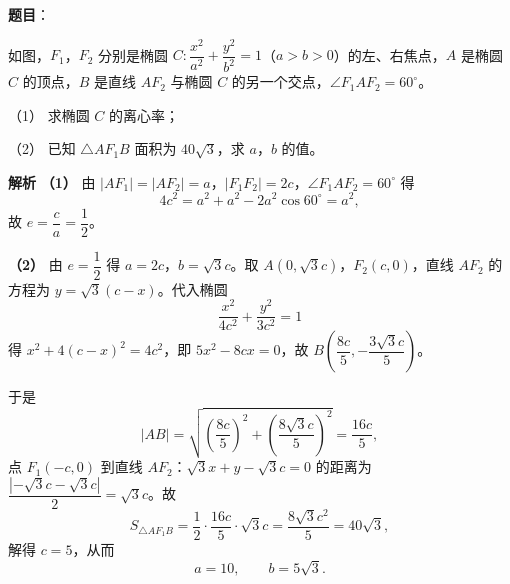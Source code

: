 \begin{answer}

\textbf{题目}：

如图，$F_1$，$F_2$ 分别是椭圆 $C:\dfrac{x^2}{a^2}+\dfrac{y^2}{b^2}=1$（$a>b>0$）的左、右焦点，$A$ 是椭圆 $C$ 的顶点，$B$ 是直线 $AF_2$ 与椭圆 $C$ 的另一个交点，$\angle F_1AF_2=60^\circ$。

（1） 求椭圆 $C$ 的离心率；

（2） 已知 $\triangle AF_1B$ 面积为 $40\sqrt3$，求 $a$，$b$ 的值。
\nopagebreak[4]
\begin{center}\end{center}
\nopagebreak[4]
\textbf{解析}
\textbf{（1）} 由 $|AF_1|=|AF_2|=a$，$|F_1F_2|=2c$，$\angle F_1AF_2=60^\circ$ 得
\nopagebreak[4]
\[4c^2=a^2+a^2-2a^2\cos60^\circ=a^2,\]
故 $e=\dfrac ca=\dfrac12$。

\textbf{（2）} 由 $e=\dfrac12$ 得 $a=2c$，$b=\sqrt3c$。取 $A(0,\sqrt3c)$，$F_2(c,0)$，直线 $AF_2$ 的方程为 $y=\sqrt3(c-x)$。代入椭圆
\nopagebreak[4]
\[\frac{x^2}{4c^2}+\frac{y^2}{3c^2}=1\]
得 $x^2+4(c-x)^2=4c^2$，即 $5x^2-8cx=0$，故 $B\left(\dfrac{8c}5,-\dfrac{3\sqrt3c}5\right)$。

于是
\nopagebreak[4]
\[|AB|=\sqrt{\left(\frac{8c}5\right)^2+\left(\frac{8\sqrt3c}5\right)^2}=\frac{16c}5,\]
点 $F_1(-c,0)$ 到直线 $AF_2$：$\sqrt3x+y-\sqrt3c=0$ 的距离为 $\dfrac{|-\sqrt3c-\sqrt3c|}2=\sqrt3c$。故
\nopagebreak[4]
\[S_{\triangle AF_1B}=\frac12\cdot\frac{16c}5\cdot\sqrt3c=\frac{8\sqrt3c^2}5=40\sqrt3,\]
解得 $c=5$，从而
\nopagebreak[4]
\[a=10,\qquad b=5\sqrt3.\]



\end{answer}
